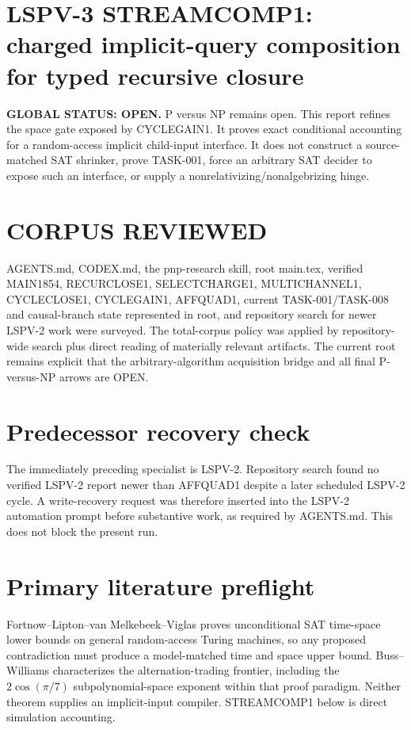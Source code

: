 \documentclass[11pt]{article}
\begin{document}
\section*{LSPV-3 STREAMCOMP1: charged implicit-query composition for typed recursive closure}
\textbf{GLOBAL STATUS: OPEN.} P versus NP remains open. This report refines the space gate exposed by CYCLEGAIN1. It proves exact conditional accounting for a random-access implicit child-input interface. It does not construct a source-matched SAT shrinker, prove TASK-001, force an arbitrary SAT decider to expose such an interface, or supply a nonrelativizing/nonalgebrizing hinge.

\section*{CORPUS REVIEWED}
AGENTS.md, CODEX.md, the pnp-research skill, root main.tex, verified MAIN1854, RECURCLOSE1, SELECTCHARGE1, MULTICHANNEL1, CYCLECLOSE1, CYCLEGAIN1, AFFQUAD1, current TASK-001/TASK-008 and causal-branch state represented in root, and repository search for newer LSPV-2 work were surveyed. The total-corpus policy was applied by repository-wide search plus direct reading of materially relevant artifacts. The current root remains explicit that the arbitrary-algorithm acquisition bridge and all final P-versus-NP arrows are OPEN.

\section*{Predecessor recovery check}
The immediately preceding specialist is LSPV-2. Repository search found no verified LSPV-2 report newer than AFFQUAD1 despite a later scheduled LSPV-2 cycle. A write-recovery request was therefore inserted into the LSPV-2 automation prompt before substantive work, as required by AGENTS.md. This does not block the present run.

\section*{Primary literature preflight}
Fortnow--Lipton--van Melkebeek--Viglas proves unconditional SAT time-space lower bounds on general random-access Turing machines, so any proposed contradiction must produce a model-matched time and space upper bound. Buss--Williams characterizes the alternation-trading frontier, including the \(2\cos(\pi/7)\) subpolynomial-space exponent within that proof paradigm. Neither theorem supplies an implicit-input compiler. STREAMCOMP1 below is direct simulation accounting.
\end{document}
